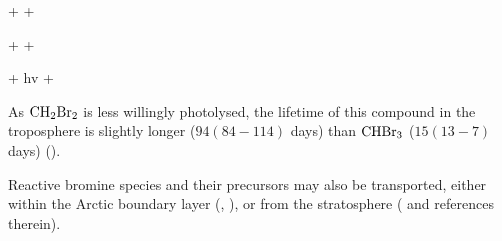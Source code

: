 \begin{reaction}
     +   + 
    \label{R:10}
\end{reaction} 
\begin{reaction}
     +   + 
    \label{R:11}
\end{reaction}
\begin{reaction}
     + hv  + 
    \label{R:12}
\end{reaction}

As $\mathrm{CH_2Br_2}$ is less willingly photolysed, the lifetime of this compound in the troposphere is slightly longer ($94 (84-114)$ days) than $\mathrm{CHBr_3}$ ($15 (13-7)$ days) (\cite{Hossaini2016_chlorine}).

\medskip

Reactive bromine species and their precursors may also be transported, either within the Arctic boundary layer (\cite{Luo2018}, \cite{Schmidt}), or from the stratosphere (\cite{Hossaini2016_chlorine} and references therein). 

